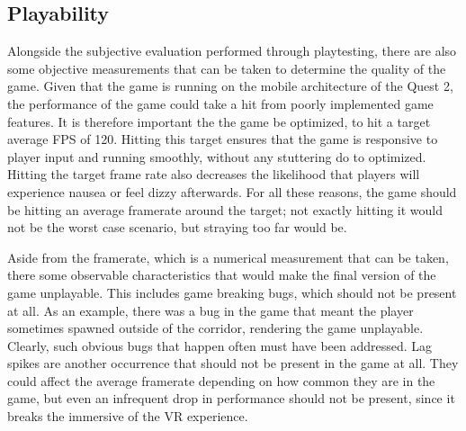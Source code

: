 \documentclass[10pt,twocolumn]{article}
\begin{document}
\subsection{Playability}
Alongside the subjective evaluation performed through playtesting, there are also some objective measurements that can be taken to determine the quality of the game. Given that the game is running on the mobile architecture of the Quest 2, the performance of the game could take a hit from poorly implemented game features. It is therefore important the the game be optimized, to hit a target average FPS of 120. Hitting this target ensures that the game is responsive to player input and running smoothly, without any stuttering do to optimized. Hitting the target frame rate also decreases the likelihood that players will experience nausea or feel dizzy afterwards. For all these reasons, the game should be hitting an average framerate around the target; not exactly hitting it would not be the worst case scenario, but straying too far would be. 

Aside from the framerate, which is a numerical measurement that can be taken, there some observable characteristics that would make the final version of the game unplayable. This includes game breaking bugs, which should not be present at all. As an example, there was a bug in the game that meant the player sometimes spawned outside of the corridor, rendering the game unplayable. Clearly, such obvious bugs that happen often must have been addressed. Lag spikes are another occurrence that should not be present in the game at all. They could affect the average framerate depending on how common they are in the game, but even an infrequent drop in performance should not be present, since it breaks the immersive of the VR experience.
\end{document}
